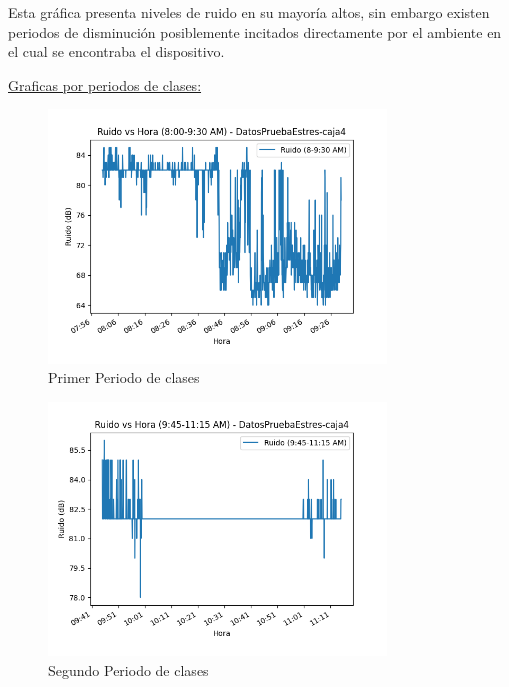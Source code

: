 \documentclass{templateNote}
\begin{document}
\begin{tcolorbox}
    Esta gráfica presenta niveles de ruido en su mayoría altos, sin embargo existen periodos de disminución posiblemente incitados directamente por el ambiente en el cual se encontraba el dispositivo.  
\end{tcolorbox}

\newpage
\underline{Graficas por periodos de clases:}

\begin{figure}[H]
    \centering
    \includegraphics[width=0.8\textwidth]{img/DatosPruebaEstres-caja4_ruido_8_9-30_am.png}
    \caption{Primer Periodo de clases}
\end{figure}

\begin{figure}[H]
    \centering
    \includegraphics[width=0.8\textwidth]{img/DatosPruebaEstres-caja4_ruido_9-45_11-15_am.png}
    \caption{Segundo Periodo de clases}
\end{figure}
\end{document}
